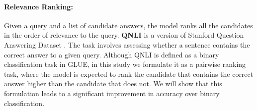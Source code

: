 \paragraph{Relevance Ranking:}
Given a query and a list of candidate answers, the model ranks all the candidates in the order of relevance to the query. 
\textbf{QNLI} is a version of Stanford Question Answering Dataset \citep{rajpurkar2016squad}. 
The task involves assessing whether a sentence contains the correct answer to a given query. 
Although QNLI is defined as a binary classification task in GLUE, in this study we formulate it as a pairwise ranking task, where the model is expected to rank the candidate that contains the correct answer higher than the candidate that does not. 
We will show that this formulation leads to a significant improvement in accuracy over binary classification.

